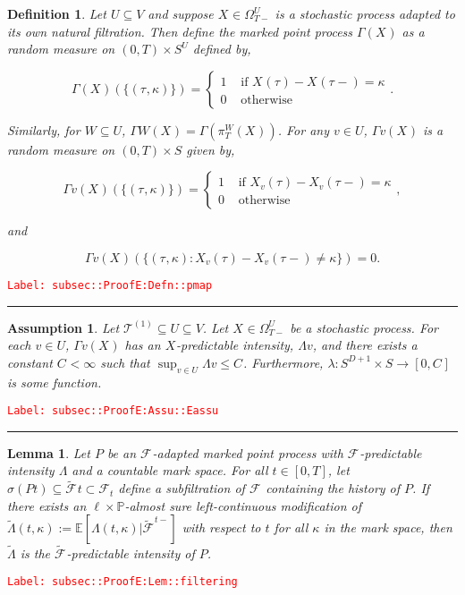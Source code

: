 \documentclass[12pt]{article}
\newcommand{\mb}{\mathbb}
\newcommand{\mc}{\mathcal}
\newcommand{\ra}{\rightarrow}
\newcommand{\te}{\text}
\newcommand{\tr}{\textcolor{red}}
\newcommand{\labe}[1]{\tr{\texttt{Label: #1}}}
\newcommand{\lin}{\rule{\linewidth}{0.4 pt}}
\newcommand{\pr}{\mb{P}}							%
\newcommand{\ex}[1]{\mb{E}\left[#1\right]}			%
\renewcommand{\v}{v}							%
\renewcommand{\U}{U}							%
\newcommand{\UU}{W}								%
\renewcommand{\S}{S}							%
\newcommand{\T}{T}								%
\renewcommand{\t}{t}							%
\newcommand{\sset}{\Omega}						%
\newcommand{\proj}{\pi}							%
\newcommand{\F}{\mc{F}}							%
\newcommand{\X}{X}								%
\newcommand{\carp}[1]{^{#1}}					%
\newcommand{\vsi}[1]{^{#1}}						%
\newcommand{\cind}[1]{_{#1}}					%
\newcommand{\tp}[1]{(#1)}						%
\newcommand{\tip}[1]{#1}						%
\newcommand{\ts}[1]{_{#1}}						%
\newcommand{\const}{C}							%
\newcommand{\degr}{D}							%
\newcommand{\tree}{\mc{T}}						%
\newcommand{\sln}[1]{^{(#1)}}					%
\newcommand{\Sm}{\ell}							%
\newcommand{\alt}[1]{\widetilde{#1}}			%
\newcommand{\indx}[1]{_{#1}}					%
\newcommand{\rt}{\tau}							%
\newcommand{\pmap}{\Gamma}						%
\renewcommand{\mark}{\kappa}					%
\newcommand{\rp}{P}								%
\newcommand{\ratee}{\Lambda}					%
\newcommand{\cratee}{\alt{\Lambda}} 			%
\newtheorem{lem}[thms]{Lemma}
\newtheorem{defn}[thms]{Definition}
\newtheorem{assu}[thms]{Assumption}
\begin{document}
\begin{defn}
Let \(\U\subseteq V\) and suppose \(\X\cind{}\tip{} \in \sset\vsi{\U}\ts{\T-}\) is a stochastic process adapted to its own natural filtration. Then define the marked point process \(\pmap{}(\X\cind{}\tip{})\) as a random measure on \((0,\T) \times \S\carp{\U}\) defined by,

\[\pmap{}(\X\cind{}\tip{})(\{(\rt\indx{},\mark{})\}) = \begin{cases}
1 &\te{ if } \X\cind{}\tp{\rt\indx{}} - \X\cind{}\tp{\rt\indx{}-} = \mark{}\\
0 &\te{ otherwise}
\end{cases}.\]

Similarly, for \(\UU \subseteq \U\), \(\pmap{\UU}(\X\cind{}\tip{}) = \pmap{}\left(\proj\vsi{\UU}\ts{\T}(\X\cind{}\tip{})\right)\). For any \(\v\in \U\), \(\pmap{\v}(\X\cind{}\tip{})\) is a random measure on \((0,\T) \times \S\) given by,

\[\pmap{\v}(\X\cind{}\tip{})(\{(\rt\indx{},\mark{})\}) = \begin{cases}
1 &\te{ if } \X\cind{\v}\tp{\rt\indx{}} - \X\cind{\v}\tp{\rt\indx{}-} = \mark{}\\
0 &\te{ otherwise}
\end{cases},\]

and

\[\pmap{\v}(\X\cind{}\tip{})(\{(\rt\indx{},\mark{}): \X\cind{\v}\tp{\rt\indx{}} - \X\cind{\v}\tp{\rt\indx{}-} \neq \mark{}\}) = 0.\]
\label{subsec::ProofE:Defn::pmap}
\end{defn}
\labe{subsec::ProofE:Defn::pmap}

\lin

\begin{assu}
Let \(\tree\sln{1}\subseteq\U \subseteq V\). Let \(\X\cind{}\tip{}\in \sset\vsi{\U}\ts{\T-}\) be a stochastic process. For each \(\v\in \U\), \(\pmap{\v}(\X\cind{}\tip{})\) has an \(\X\cind{}\tip{}\)-predictable intensity, \(\ratee{\v}\), and there exists a constant \(\const\indx{} < \infty\) such that \(\sup_{\v\in\U} \ratee{\v} \leq \const\indx{}\). Furthermore, \(\lambda: \S\carp{\degr+1}\times \S\ra[0,\const\indx{}]\) is some function.
\label{subsec::ProofE:Assu::Eassu}
\end{assu}
\labe{subsec::ProofE:Assu::Eassu}

\lin

\begin{lem}
Let \(\rp{}\) be an \(\F\vsi{}\ts{}\)-adapted marked point process with \(\F\vsi{}\ts{}\)-predictable intensity \(\ratee{}\) and a countable mark space. For all \(\t \in [0,\T]\), let \(\sigma(\rp{\t}) \subseteq \alt{\F\ts{}}{\t}\subset \F\vsi{}\ts{\t}\) define a subfiltration of \(\F\vsi{}\ts{}\) containing the history of \(\rp{}\). If there exists an \(\Sm\times \pr\)-almost sure left-continuous modification of \(\cratee{}{}(\t,\mark{}) := \ex{\ratee{}(\t,\mark{})|\alt{\F\vsi{}\ts{}}^{\t-}}\) with respect to \(\t\) for all \(\mark{}\) in the mark space, then \(\cratee{}{}\) is the \(\alt{\F\vsi{}\ts{}}\)-predictable intensity of \(\rp{}\).
\label{subsec::ProofE:Lem::filtering}
\end{lem}
\labe{subsec::ProofE:Lem::filtering}
\end{document}
